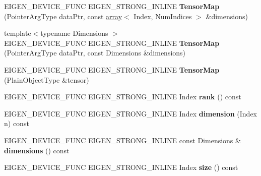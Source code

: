 \begin{DoxyCompactItemize}
\item 
\mbox{\label{class_eigen_1_1_tensor_map_a1713f5e0a4b10f0b1ecf2d17c9dca043}} 
E\+I\+G\+E\+N\+\_\+\+D\+E\+V\+I\+C\+E\+\_\+\+F\+U\+NC E\+I\+G\+E\+N\+\_\+\+S\+T\+R\+O\+N\+G\+\_\+\+I\+N\+L\+I\+NE {\bfseries Tensor\+Map} (Pointer\+Arg\+Type data\+Ptr, const \hyperlink{class_eigen_1_1array}{array}$<$ Index, Num\+Indices $>$ \&dimensions)
\item 
\mbox{\label{class_eigen_1_1_tensor_map_a4feacd7bdab7d27868b7ce2a6cc9e442}} 
{\footnotesize template$<$typename Dimensions $>$ }\\E\+I\+G\+E\+N\+\_\+\+D\+E\+V\+I\+C\+E\+\_\+\+F\+U\+NC E\+I\+G\+E\+N\+\_\+\+S\+T\+R\+O\+N\+G\+\_\+\+I\+N\+L\+I\+NE {\bfseries Tensor\+Map} (Pointer\+Arg\+Type data\+Ptr, const Dimensions \&dimensions)
\item 
\mbox{\label{class_eigen_1_1_tensor_map_a3128da48ac78f02a62d274423e70eb17}} 
E\+I\+G\+E\+N\+\_\+\+D\+E\+V\+I\+C\+E\+\_\+\+F\+U\+NC E\+I\+G\+E\+N\+\_\+\+S\+T\+R\+O\+N\+G\+\_\+\+I\+N\+L\+I\+NE {\bfseries Tensor\+Map} (Plain\+Object\+Type \&tensor)
\item 
\mbox{\label{class_eigen_1_1_tensor_map_a074e32d5b247cb96189660b0cc35d0cc}} 
E\+I\+G\+E\+N\+\_\+\+D\+E\+V\+I\+C\+E\+\_\+\+F\+U\+NC E\+I\+G\+E\+N\+\_\+\+S\+T\+R\+O\+N\+G\+\_\+\+I\+N\+L\+I\+NE Index {\bfseries rank} () const
\item 
\mbox{\label{class_eigen_1_1_tensor_map_adfb930b8289836aad40d64171bde46a1}} 
E\+I\+G\+E\+N\+\_\+\+D\+E\+V\+I\+C\+E\+\_\+\+F\+U\+NC E\+I\+G\+E\+N\+\_\+\+S\+T\+R\+O\+N\+G\+\_\+\+I\+N\+L\+I\+NE Index {\bfseries dimension} (Index n) const
\item 
\mbox{\label{class_eigen_1_1_tensor_map_adf190cbdc86c4759126b3ab2478c7087}} 
E\+I\+G\+E\+N\+\_\+\+D\+E\+V\+I\+C\+E\+\_\+\+F\+U\+NC E\+I\+G\+E\+N\+\_\+\+S\+T\+R\+O\+N\+G\+\_\+\+I\+N\+L\+I\+NE const Dimensions \& {\bfseries dimensions} () const
\item 
\mbox{\label{class_eigen_1_1_tensor_map_a715f830bbfa94beb8b2deb053530afd6}} 
E\+I\+G\+E\+N\+\_\+\+D\+E\+V\+I\+C\+E\+\_\+\+F\+U\+NC E\+I\+G\+E\+N\+\_\+\+S\+T\+R\+O\+N\+G\+\_\+\+I\+N\+L\+I\+NE Index {\bfseries size} () const

\end{DoxyCompactItemize}
